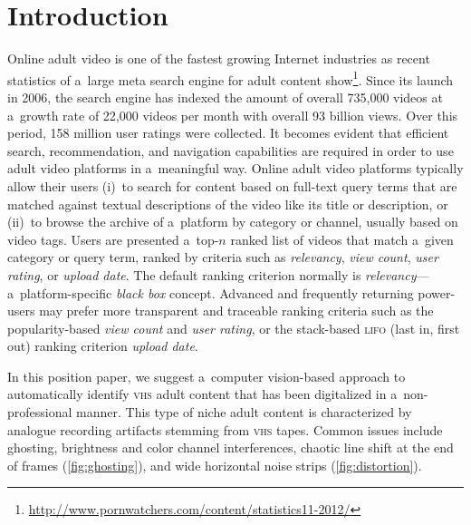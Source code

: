 \documentclass[runningheads,a4paper]{llncs}
\begin{document}
\section{Introduction}
\vspace{-1.5em}
Online adult video is one of the fastest growing Internet industries
as recent statistics of a~large meta search engine for adult content
show\footnote{\url{http://www.pornwatchers.com/content/statistics11-2012/}}.
Since its launch in 2006, the search engine has indexed
the amount of overall 735,000 videos at a~growth rate of 22,000 videos per month
with overall 93 billion views.
Over this period, 158 million user ratings were collected.
It becomes evident that efficient search, recommendation, and
navigation capabilities are required in order to use
adult video platforms in a~meaningful way.
Online adult video platforms typically allow their users
(i)~to search for content based on full-text query terms
that are matched against textual descriptions
of the video like its title or description,
or (ii)~to browse the archive of a~platform by category or channel,
usually based on video tags.
Users are presented a~top-$n$ ranked list of videos
that match a~given category
or query term, ranked by criteria such as
\emph{relevancy}, \emph{view count},
\emph{user rating}, or \emph{upload date}.
The default ranking criterion normally is
\emph{relevancy}---a~platform-specific \emph{black box} concept.
Advanced and frequently returning power-users
may prefer more transparent and traceable ranking criteria
such as the popularity-based \emph{view count}
and \emph{user rating}, or the stack-based
{\scshape lifo} (last in, first out) ranking criterion \emph{upload date}.

In this position paper, we suggest a~computer vision-based
approach to automatically identify {\scshape vhs} adult content
that has been digitalized in a~non-professional manner.
This type of niche adult content is characterized by
analogue recording artifacts stemming from {\scshape vhs} tapes.
Common issues include
ghosting, brightness and color channel interferences,
chaotic line shift at the end of frames (\autoref{fig:ghosting}),
and wide horizontal noise strips (\autoref{fig:distortion}).
\end{document}
